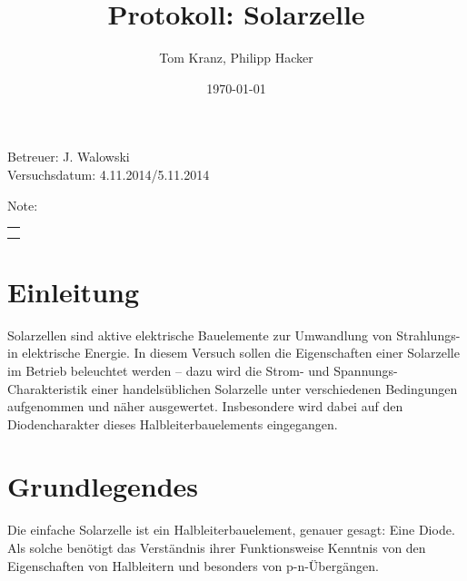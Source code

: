 \documentclass[numbers=noenddot,12pt,a4paper]{scrartcl}
\title{Protokoll: Solarzelle}
\author{Tom Kranz, Philipp Hacker}
\date{\today}
\begin{document}
\maketitle
\begin{center}
Betreuer: J. Walowski\\
Versuchsdatum: 4.11.2014/5.11.2014\\
\begin{table}[h]
\centering
Note: %
\begin{tabularx}{1.5cm}{|X|}
\hline \\ \\
\hline
\end{tabularx}
\end{table}
\end{center}
\vspace*{\fill}
\tableofcontents
\vfill
\newpage
\section{Einleitung}
Solarzellen sind aktive elektrische Bauelemente zur Umwandlung von Strahlungs- in elektrische Energie. In diesem Versuch sollen die Eigenschaften einer Solarzelle im Betrieb beleuchtet werden -- dazu wird die Strom- und Spannungs-Charakteristik einer handelsüblichen Solarzelle unter verschiedenen Bedingungen aufgenommen und näher ausgewertet. Insbesondere wird dabei auf den Diodencharakter dieses Halbleiterbauelements eingegangen.
\section{Grundlegendes}
Die einfache Solarzelle ist ein Halbleiterbauelement, genauer gesagt: Eine Diode. Als solche benötigt das Verständnis ihrer Funktionsweise Kenntnis von den Eigenschaften von Halbleitern und besonders von p-n-Übergängen.
\end{document}
